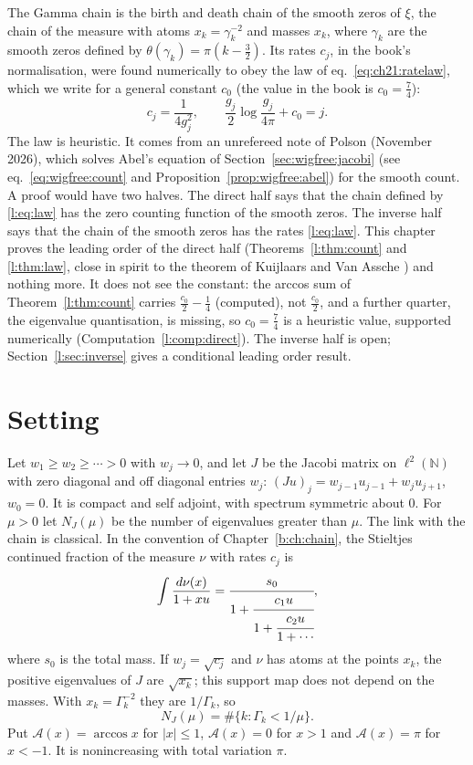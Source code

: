 \label{l:ch:bohr}

The Gamma chain is the birth and death chain of the smooth zeros of $\xi$, the chain of the measure with atoms $x_k=\gamma_k^{-2}$ and masses $x_k$, where $\gamma_k$ are the smooth zeros defined by $\theta(\gamma_k)=\pi(k-\frac32)$. Its rates $c_j$, in the book's normalisation, were found numerically to obey the law of eq.~\eqref{eq:ch21:ratelaw}, which we write for a general constant $c_0$ (the value in the book is $c_0=\frac74$):
\begin{equation}\label{l:eq:law}
c_j=\frac1{4g_j^2},\qquad\frac{g_j}2\log\frac{g_j}{4\pi}+c_0=j .
\end{equation}
The law is heuristic. It comes from an unrefereed note of Polson (November 2026), which solves Abel's equation of Section~\ref{sec:wigfree:jacobi} (see eq.~\eqref{eq:wigfree:count} and Proposition~\ref{prop:wigfree:abel}) for the smooth count. A proof would have two halves. The direct half says that the chain defined by \eqref{l:eq:law} has the zero counting function of the smooth zeros. The inverse half says that the chain of the smooth zeros has the rates \eqref{l:eq:law}. This chapter proves the leading order of the direct half (Theorems~\ref{l:thm:count} and \ref{l:thm:law}, close in spirit to the theorem of Kuijlaars and Van Assche \cite{KVA99}) and nothing more. It does not see the constant: the arccos sum of Theorem~\ref{l:thm:count} carries $\frac{c_0}2-\frac14$ (computed), not $\frac{c_0}2$, and a further quarter, the eigenvalue quantisation, is missing, so $c_0=\frac74$ is a heuristic value, supported numerically (Computation~\ref{l:comp:direct}). The inverse half is open; Section~\ref{l:sec:inverse} gives a conditional leading order result.

\section{Setting}

Let $w_1\ge w_2\ge\cdots>0$ with $w_j\to0$, and let $J$ be the Jacobi matrix on $\ell^2(\mathbb N)$ with zero diagonal and off diagonal entries $w_j$: $(Ju)_j=w_{j-1}u_{j-1}+w_ju_{j+1}$, $w_0=0$. It is compact and self adjoint, with spectrum symmetric about $0$. For $\mu>0$ let $N_J(\mu)$ be the number of eigenvalues greater than $\mu$. The link with the chain is classical. In the convention of Chapter~\ref{b:ch:chain}, the Stieltjes continued fraction of the measure $\nu$ with rates $c_j$ is
\[
\int\frac{d\nu(x)}{1+xu}=\cfrac{s_0}{1+\cfrac{c_1u}{1+\cfrac{c_2u}{1+\cdots}}},
\]
where $s_0$ is the total mass. If $w_j=\sqrt{c_j}$ and $\nu$ has atoms at the points $x_k$, the positive eigenvalues of $J$ are $\sqrt{x_k}$; this support map does not depend on the masses. With $x_k=\Gamma_k^{-2}$ they are $1/\Gamma_k$, so
\[
N_J(\mu)=\#\{k:\Gamma_k<1/\mu\}.
\]
Put $\mathcal A(x)=\arccos x$ for $|x|\le1$, $\mathcal A(x)=0$ for $x>1$ and $\mathcal A(x)=\pi$ for $x<-1$. It is nonincreasing with total variation $\pi$.

